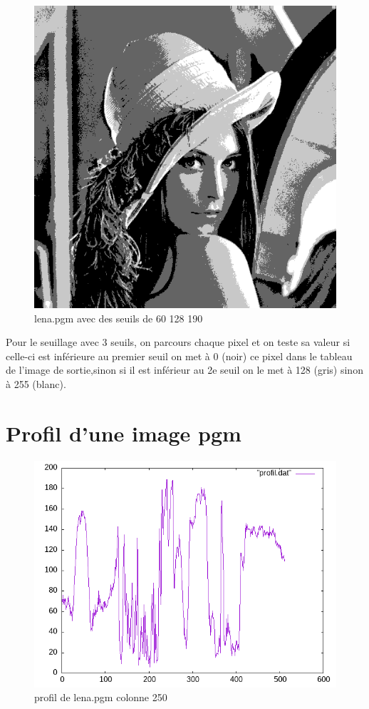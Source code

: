 \documentclass{article}
\begin{document}
\begin{figure}[h]
\centerline{\includegraphics[scale=0.3]{./rendus/lena3Seuil.png}}
\caption{lena.pgm avec des seuils de 60 128 190}
\end{figure}

Pour le seuillage avec 3 seuils, on parcours chaque pixel et on teste sa valeur si celle-ci est inférieure au premier seuil on met à 0 (noir) ce pixel dans le tableau de l'image de sortie,sinon si il est inférieur au 2e seuil on le met à 128 (gris) sinon à 255 (blanc).

\newpage
\section{Profil d'une image pgm}

\begin{figure}[h]
\centerline{\includegraphics[scale=0.5]{./rendus/profilpgmlena.png}}
\caption{profil de lena.pgm colonne 250}
\end{figure}
\end{document}
